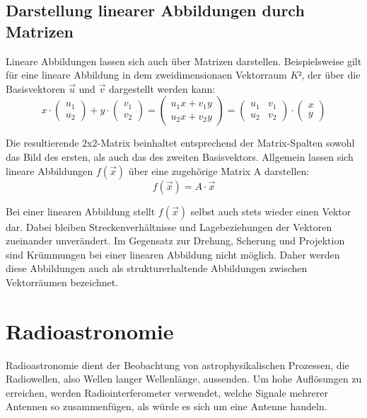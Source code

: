 \documentclass[]{dsadokumentation}
\begin{document}
\subsection{Darstellung linearer Abbildungen durch Matrizen}
Lineare Abbildungen lassen sich auch über Matrizen darstellen. Beispielsweise gilt für eine lineare Abbildung in dem zweidimensionaen Vektorraum $K²$, der über die Basisvektoren $\vec{u}$ und $\vec{v}$ dargestellt werden kann:
\[x \cdot \left(\begin{array}{c} u_1 \\ u_2 \end{array}\right) + y \cdot \left(\begin{array}{c} v_1 \\ v_2 \end{array}\right) = \left(\begin{array}{c} u_1 x + v_1 y \\ u_2 x + v_2 y \end{array}\right) = \left( \begin{array}{rr} u_1 & v_1 \\ u_2 & v_2 \end{array}\right) \cdot \left(\begin{array}{c} x \\ y \end{array}\right) \]

Die resultierende $2$x$2$-Matrix beinhaltet entsprechend der Matrix-Spalten sowohl das Bild des ersten, als auch das des zweiten Basisvektors. Allgemein lassen sich lineare Abbildungen $f(\vec{x})$ über eine zugehörige Matrix A darstellen:
\[ f(\vec{x}) = A \cdot \vec{x} \]

Bei einer linearen Abbildung stellt $f(\vec{x})$ selbst auch stets wieder einen Vektor dar. Dabei bleiben Streckenverhältnisse und Lagebeziehungen der Vektoren zueinander unverändert. Im Gegensatz zur Drehung, Scherung und Projektion sind Krümmungen bei einer linearen Abbildung nicht möglich. Daher werden diese Abbildungen auch als strukturerhaltende Abbildungen zwischen Vektorräumen bezeichnet.

\section{Radioastronomie}

Radioastronomie dient der Beobachtung von astrophysikalischen Prozessen, die Radiowellen, also Wellen langer Wellenlänge, aussenden. Um hohe Auflösungen zu erreichen, werden Radiointerferometer verwendet, welche Signale mehrerer Antennen so zusammenfügen, als würde es sich um eine Antenne handeln.
\end{document}
